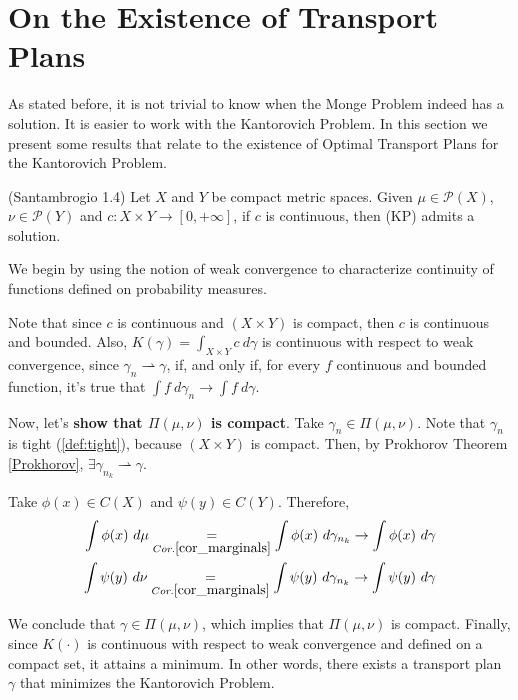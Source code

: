 \newpage
\chapter{On the Existence of Transport Plans}
As stated before, it is not trivial to know when the Monge Problem
indeed has a solution. It is easier to work with the Kantorovich
Problem. In this section we present some results that relate
to the existence of Optimal Transport Plans for the Kantorovich Problem.

\begin{theorem}(Santambrogio 1.4)
  Let $X$ and $Y$ be compact metric spaces.
  Given $\mu\in \mathcal{P}(X)$, $\nu \in \mathcal P(Y)$ and
  $c:X\times Y \to[0,+\infty]$, if $c$ is continuous, then
  (KP) admits a solution.
  \label{thm:Santambrogio1.4}
\end{theorem}
\begin{prf}
  We begin by using the notion of weak convergence to characterize
  continuity of functions defined on probability measures.

  Note that since $c$ is continuous and $(X \times Y)$ is compact,
  then $c$ is continuous and bounded. Also,
  $K(\gamma) = \int_{X\times Y}c \ d\gamma$ is continuous with respect to weak
  convergence, since
  $\gamma_n \rightharpoonup \gamma$, if, and only if, for every $f$ continuous
  and bounded function, it's true that $\int f \ d\gamma_n \to \int f \ d\gamma$.

  Now, let's \textbf{show that $\Pi(\mu,\nu)$ is compact}.
  Take $\gamma_n \in \Pi(\mu,\nu)$. Note that $\gamma_n$ is tight (\ref{def:tight}),
  because $(X\times Y)$ is compact. Then, by Prokhorov Theorem \ref{Prokhorov},
  $\exists \gamma_{n_k} \rightharpoonup \gamma$.

  Take $\phi(x) \in C(X)$ and $\psi(y) \in C(Y)$. Therefore,
  \begin{equation*}
    \begin{split}
      \int \phi(x) \ d\mu
      \underset{Cor.\ref{cor_marginals}}{=}
      \int\phi(x)\ d\gamma_{n_k}
      \to
      \int \phi(x) \ d\gamma \\
      \int \psi(y) \ d\nu
      \underset{Cor.\ref{cor_marginals}}{=}
      \int\psi(y)\ d\gamma_{n_k}
      \to
      \int \psi(y) \ d\gamma
    \end{split}
  \end{equation*}

  We conclude that $\gamma \in \Pi(\mu,\nu)$, which implies that
  $\Pi(\mu,\nu)$ is compact. Finally, since $K(\cdot)$ is continuous with respect to weak convergence
  and defined on a compact set, it attains a minimum. In other words,
  there exists a transport plan $\gamma$ that minimizes the Kantorovich
  Problem.
\end{prf}

